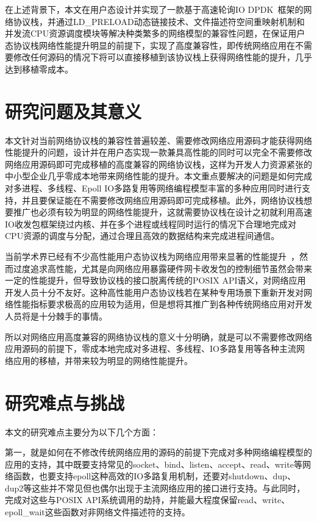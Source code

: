 在上述背景下，本文在用户态设计并实现了一款基于高速轮询IO DPDK~\cite{DPDK}框架的网络协议栈，并通过LD\_PRELOAD动态链接技术、文件描述符空间重映射机制和并发流CPU资源调度模块等解决种类繁多的网络模型的兼容性问题，在保证用户态协议栈网络性能提升明显的前提下，实现了高度兼容性，即传统网络应用在不需要修改任何源码的情况下将可以直接移植到该协议栈上获得网络性能的提升，几乎达到移植零成本。

\section{研究问题及其意义}
\label{sec:01_problem_intro}
本文针对当前网络协议栈的兼容性普遍较差、需要修改网络应用源码才能获得网络性能提升的问题，设计并在用户态实现一款兼具高性能的同时可以完全不需要修改网络应用源码即可完成移植的高度兼容的网络协议栈，这样为开发人力资源紧张的中小型企业几乎零成本地带来网络性能的提升。本文重点要解决的问题是如何完成对多进程、多线程、Epoll IO多路复用等网络编程模型丰富的多种应用同时进行支持，并且要保证能在不需要修改网络应用源码即可完成移植。此外，网络协议栈想要推广也必须有较为明显的网络性能提升，这就需要协议栈在设计之初就利用高速IO收发包框架绕过内核、并在多个进程或线程同时运行的情况下合理地完成对CPU资源的调度与分配，通过合理且高效的数据结构来完成进程间通信。

当前学术界已经有不少高性能用户态协议栈为网络应用带来显著的性能提升~\cite{mTCP,IX,ZygOS}，然而过度追求高性能，尤其是向网络应用暴露硬件网卡收发包的控制细节虽然会带来一定的性能提升，但导致协议栈的接口脱离传统的POSIX API语义，对网络应用开发人员十分不友好。这种高性能用户态协议栈若在某种专用场景下重新开发对网络性能指标要求极高的应用较为适用，但是想将其推广到各种传统网络应用对开发人员将是十分棘手的事情。

所以对网络应用高度兼容的网络协议栈的意义十分明确，就是可以不需要修改网络应用源码的前提下，零成本地完成对多进程、多线程、IO多路复用等各种主流网络应用的移植，并带来较为明显的网络性能提升。

\section{研究难点与挑战}
\label{sec:01_difficulties_and_chanllenge}
本文的研究难点主要分为以下几个方面：

第一，就是如何在不修改传统网络应用的源码的前提下完成对多种网络编程模型的应用的支持，其中既要支持常见的socket、bind、listen、accept、read、write等网络函数，也要支持epoll这种高效的IO多路复用机制，还要对shutdown、dup、dup2等这些并不常见但也偶尔出现于主流网络应用的接口进行支持。与此同时，完成对这些与POSIX API系统调用的劫持，并能最大程度保留read、write、epoll\_wait这些函数对非网络文件描述符的支持。

